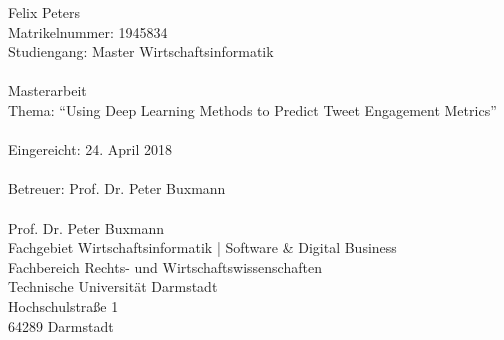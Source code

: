 %
%
%
%

\singlespacing 
\noindent Felix Peters \\
Matrikelnummer: 1945834 \\
Studiengang: Master Wirtschaftsinformatik \\\\
Masterarbeit \\
Thema: ``Using Deep Learning Methods to Predict Tweet Engagement Metrics'' \\\\
Eingereicht: 24. April 2018 \\\\
Betreuer: Prof. Dr. Peter Buxmann \\\\
Prof. Dr. Peter Buxmann \\
Fachgebiet Wirtschaftsinformatik | Software \& Digital Business \\
Fachbereich Rechts- und Wirtschaftswissenschaften \\
Technische Universität Darmstadt \\
Hochschulstraße 1 \\
64289 Darmstadt \\

\onehalfspacing

\setcounter{page}{2}
